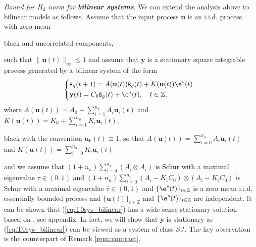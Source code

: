 \documentclass{ifacconf}
\def\eqref#1{(\ref{#1})}
\def\rvu{{\mathbf{i}}}
\def\rvs{{\mathbf{s}}}
\def\rvu{{\mathbf{u}}}
\def\rvy{{\mathbf{y}}}
\def\sZ{{\mathbb{Z}}}
\newcommand{\class}{\(\mathcal{SI}\)}
\begin{document}
\textit{Bound for $H_2$ norm for \textbf{bilinear systems}}.
  We can extend the analysis above to bilinear models as follows. Assume that the input process $\rvu$ is an i.i.d. process with zero mean \begin{color}{black} and uncorrelated components, \end{color}
  such that $\|\rvu(t)\|_{\infty} \le 1$ and assume that $\rvy$ is a stationary square integrable 
  process generated by a bilinear system of the form
  \begin{equation}
    \label{eq:T0sys_bilinear}
    \left\{
    \begin{split}
		&\hat{\rvs}_{g}(t+1)=A(\rvu(t))\hat{\rvs}_g(t)+K(\rvu(t))\e^s(t) \\
    & \rvy(t) = C_0\hat{\rvs}_{g}(t)+\e^s(t), \quad t \in \sZ,
    \end{split}
    \right.
  \end{equation}
  where $A(\rvu(t))=A_0+\sum_{i=1}^{n_u}A_i\rvu_i(t)$ and $K(\rvu(t))=K_0+\sum_{i=1}^{n_u} K_i\rvu_i(t)$, \begin{color}{black} with the convention $\rvu_0(t) \equiv 1$, so that $A(\rvu(t))=\sum_{i=0}^{n_u} A_i\rvu_i(t)$ and  $K(\rvu(t))=\sum_{i=0}^{n_u} K_i\rvu_i(t)$\end{color} and
  we assume that $(1+n_u)\sum_{i=0}^{n_u} (A_i \otimes A_i)$ is Schur with a maximal eigenvalue $\tau \in (0,1)$
  and $(1+n_u)\sum_{i=0}^{n_u} (A_i-K_iC_0) \otimes (A_i-K_iC_0)$ is Schur with a maximal eigenvalue $\hat{\tau} \in (0,1)$
  and $\{\e^s(t)\}_{t \in \sZ}$ is a zero mean i.i.d. essentially bounded  process and 
  $\{\rvu(t)\}_{t \in \sZ}$ and $\{\e^s(t)\}_{t \in \sZ}$ are independent.
  It can be shown that \eqref{eq:T0sys_bilinear} has a wide-sense stationary solution based 
  on \cite[Lemma 1]{TAC:MPRV}, see appendix. %
  In fact, we will show that $\rvy$ is stationary
  as \eqref{eq:T0sys_bilinear} can be viewed as a system of class \class{}. The key observation is the counterpart of Remark \ref{rem::contract}.\\
\end{document}
